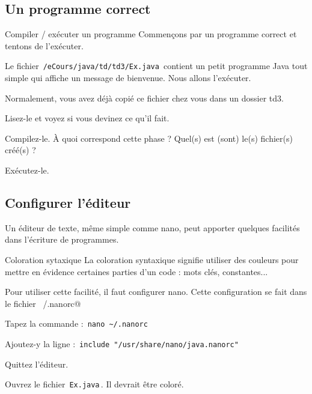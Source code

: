 \documentclass[a4paper,11pt]{article}
\begin{document}
	\subsection{Un programme correct}
		\begin{Tutoriel}{Compiler / ex\'ecuter un programme} 
		          Commen\c cons par un programme correct et tentons de l'ex\'ecuter.  
        			\par
          		Le fichier \,\verb|/eCours/java/td/td3/Ex.java|\, contient un petit programme Java tout simple qui affiche un message de bienvenue. Nous allons l'ex\'ecuter.  
        
           		 \par
        
			\begin{steps}	
				\item Normalement, vous avez d\'ej\`a copi\'e ce fichier chez vous dans un dossier td3.
				\item Lisez-le et voyez si vous devinez ce qu'il fait.
				\item Compilez-le. \`A quoi correspond cette phase ? Quel(s) est (sont) le(s) fichier(s) cr\'e\'e(s) ? 
				\item Ex\'ecutez-le. 
			\end{steps}
			
		\end{Tutoriel}
	\subsection{Configurer l'\'editeur}

		Un \'editeur de texte, m\^eme simple comme nano, peut apporter quelques facilit\'es dans l'\'ecriture de programmes.
		
            	\par
        
			
		\begin{Tutoriel}{Coloration sytaxique} 
       			La coloration syntaxique signifie utiliser des couleurs pour mettre en \'evidence certaines parties d'un code :
			mots cl\'es, constantes...
        
            		\par
        
			Pour utiliser cette facilit\'e, il faut configurer nano. Cette configuration se fait dans le fichier \verb@~/.nanorc@
            		\par
        
			\begin{steps}
				\item Tapez la commande : \,\verb|nano ~/.nanorc|\,
				\item Ajoutez-y la ligne : \,\verb|include "/usr/share/nano/java.nanorc"|\,
				\item Quittez l'\'editeur.
				\item Ouvrez le fichier \,\verb|Ex.java|\,. Il devrait \^etre color\'e.
			\end{steps}
		\end{Tutoriel}
				
\end{document}
